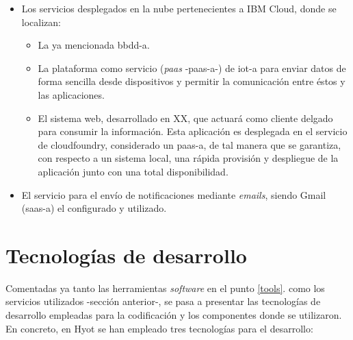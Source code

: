 \documentclass[12pt,a4paper, twoside]{report}
\begin{document}
\begin{itemize}
\begin{itemize}
			\item Los servicios desplegados en la nube pertenecientes a IBM Cloud, donde se localizan:
			
			\begin{itemize}
				\item La ya mencionada \gls{bbdd-a}.
				\item La plataforma como servicio (\textit{\gls{paas}} -\gls{paas-a}-) de \gls{iot-a} para enviar datos de forma sencilla desde dispositivos y permitir la comunicación entre éstos y las aplicaciones. 
				\item El sistema web, desarrollado en {\color{red}XX}, que actuará como cliente delgado para consumir la información. Esta aplicación es desplegada en el servicio de \gls{cloudfoundry}, considerado un \gls{paas-a}, de tal manera que se garantiza, con respecto a un sistema local, una rápida provisión y despliegue de la aplicación junto con una total disponibilidad. %
			\end{itemize}
			
			\item El servicio para el envío de notificaciones mediante \textit{emails}, siendo Gmail (\gls{saas-a}) el configurado y utilizado.
		\end{itemize}
	\end{itemize}
			
	\section{Tecnologías de desarrollo}
	
	Comentadas ya tanto las herramientas \textit{software} en el punto \ref{tools}.  como los servicios utilizados -sección anterior-, se pasa a presentar las tecnologías de desarrollo empleadas para la codificación y los componentes donde se utilizaron. En concreto, en Hyot se han empleado tres tecnologías para el desarrollo:
	
\end{document}
